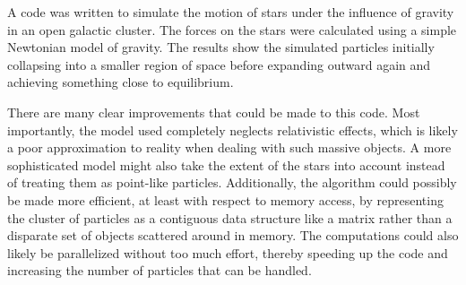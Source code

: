\documentclass[aps,prc,reprint,floatfix,nobalancelastpage]{revtex4-1}
\begin{document}
    A code was written to simulate the motion of stars under the influence of gravity in an open galactic cluster. The forces on the stars were calculated using a simple Newtonian model of gravity. The results show the simulated particles initially collapsing into a smaller region of space before expanding outward again and achieving something close to equilibrium.

    There are many clear improvements that could be made to this code. Most importantly, the model used completely neglects relativistic effects, which is likely a poor approximation to reality when dealing with such massive objects. A more sophisticated model might also take the extent of the stars into account instead of treating them as point-like particles. Additionally, the algorithm could possibly be made more efficient, at least with respect to memory access, by representing the cluster of particles as a contiguous data structure like a matrix rather than a disparate set of objects scattered around in memory. The computations could also likely be parallelized without too much effort, thereby speeding up the code and increasing the number of particles that can be handled.


\end{document}
